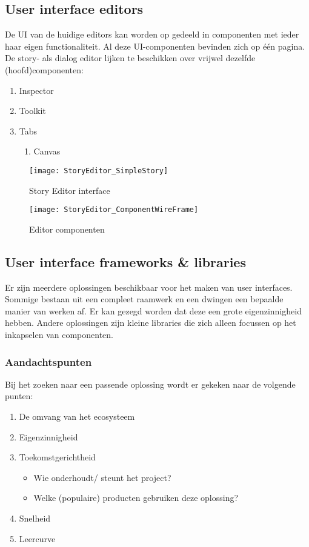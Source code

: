 \subsection{User interface editors}
De UI van de huidige editors kan worden op gedeeld in componenten met ieder haar eigen functionaliteit. Al deze UI-componenten bevinden zich op één pagina. De story- als dialog editor lijken te beschikken over vrijwel dezelfde (hoofd)componenten:
\begin{enumerate}
    \item Inspector
    \item Toolkit
    \item Tabs
    \begin{enumerate}
        \item Canvas
    \end{enumerate}
\end{enumerate}

\begin{figure}[htb]
    \texttt{[image: StoryEditor\_SimpleStory]}
    \caption{Story Editor interface}
    \label{fig:storyeditorinterface}
    \centering
\end{figure}

\begin{figure}[htb]
    \texttt{[image: StoryEditor\_ComponentWireFrame]}
    \caption{Editor componenten}
    \label{fig:storyeditorcomponents}
    \centering
\end{figure}

\subsection{User interface frameworks \& libraries}
Er zijn meerdere oplossingen beschikbaar voor het maken van user interfaces. Sommige bestaan uit een compleet raamwerk en een dwingen een bepaalde manier van werken af. Er kan gezegd worden dat deze een grote eigenzinnigheid hebben. Andere oplossingen zijn kleine libraries die zich alleen focussen op het inkapselen van componenten.

\subsubsection{Aandachtspunten}
Bij het zoeken naar een passende oplossing wordt er gekeken naar de volgende punten:
\begin{enumerate}
    \item De omvang van het ecosysteem
    \item Eigenzinnigheid
    \item Toekomstgerichtheid
    \begin{itemize}
        \item Wie onderhoudt/ steunt het project?
        \item Welke (populaire) producten gebruiken deze oplossing?
    \end{itemize}
    \item Snelheid
    \item Leercurve    
\end{enumerate}

